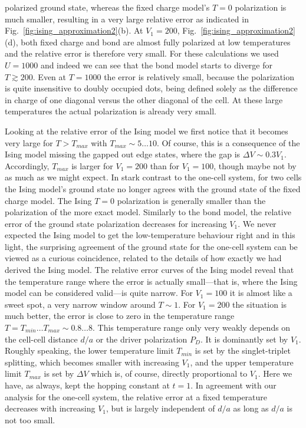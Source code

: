 polarized ground state, whereas the fixed charge model's $T=0$ polarization is
much smaller, resulting in a very large relative error as indicated in
Fig.~\ref{fig:ising_approximation2}(b). At $V_1 = 200$,
Fig.~\ref{fig:ising_approximation2}(d), both fixed charge and bond are almost
fully polarized at low temperatures and the relative error is therefore very
small. For these calculations we used $U=1000$ and indeed we can see that the
bond model starts to diverge for $T \gtrsim 200$. Even at $T=1000$ the error is
relatively small, because the polarization is quite insensitive to doubly
occupied dots, being defined solely as the difference in charge of one diagonal
versus the other diagonal of the cell. At these large temperatures the actual
polarization is already very small.

Looking at the relative error of the Ising model we first notice that it becomes
very large for $T > T_{max}$ with $T_{max} \sim 5 \ldots 10$. Of course, this is
a consequence of the Ising model missing the gapped out edge states, where the
gap is $\Delta V \sim 0.3 V_1$. Accordingly, $T_{max}$ is larger for $V_1 = 200$
than for $V_1 = 100$, though maybe not by as much as we might expect. In stark
contrast to the one-cell system, for two cells the Ising model's ground state no
longer agrees with the ground state of the fixed charge model. The Ising $T=0$
polarization is generally smaller than the polarization of the more exact model.
Similarly to the bond model, the relative error of the ground state polarization
decreases for increasing $V_1$. We never expected the Ising model to get the
low-temperature behaviour right and in this light, the surprising agreement of
the ground state for the one-cell system can be viewed as a curious coincidence,
related to the details of how exactly we had derived the Ising model. The
relative error curves of the Ising model reveal that the temperature range where
the error is actually small---that is, where the Ising model can be considered
valid---is quite narrow. For $V_1 = 100$ it is almost like a sweet spot, a very
narrow window around $T \sim 1$. For $V_1 = 200$ the situation is much better,
the error is close to zero in the temperature range $T = T_{min} \ldots T_{max}
\sim 0.8 \ldots 8$. This temperature range only very weakly depends on the
cell-cell distance $d/a$ or the driver polarization $P_D$. It is dominantly set
by $V_1$. Roughly speaking, the lower temperature limit $T_{min}$ is set by the
singlet-triplet splitting, which becomes smaller with increasing $V_1$, and the
upper temperature limit $T_{max}$ is set by $\Delta V$ which is, of course,
directly proportional to $V_1$. Here we have, as always, kept the hopping
constant at $t=1$. In agreement with our analysis for the one-cell system, the
relative error at a fixed temperature decreases with increasing $V_1$, but is
largely independent of $d/a$ as long as $d/a$ is not too small.

